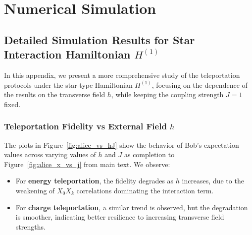 \section{Numerical Simulation}
\subsection{Detailed Simulation Results for Star Interaction Hamiltonian \texorpdfstring{\( H^{(1)} \)}{H1}}
\label{appendix:numerical-simulation}

In this appendix, we present a more comprehensive study of the teleportation protocols under the star-type Hamiltonian \( H^{(1)} \), focusing on the dependence of the results on the transverse field \( h \), while keeping the coupling strength \( J = 1 \) fixed.

\subsubsection{Teleportation Fidelity vs External Field \texorpdfstring{\( h \)}{h}}

The plots in Figure~\ref{fig:alice_vs_hJ} show the behavior of Bob's expectation values across varying values of \( h \) and \( J \) as completion to Figure~\ref{fig:alice_x_vs_j} from main text. We observe:

\begin{itemize}
    \item For \textbf{energy teleportation}, the fidelity degrades as \( h \) increases, due to the weakening of \( X_0 X_k \) correlations dominating the interaction term.
    \item For \textbf{charge teleportation}, a similar trend is observed, but the degradation is smoother, indicating better resilience to increasing transverse field strengths.
\end{itemize}

